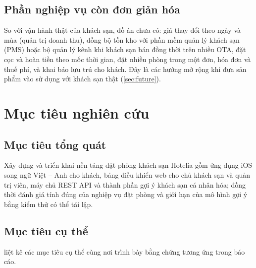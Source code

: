 \subsection{Phần nghiệp vụ còn đơn giản hóa}

So với vận hành thật của khách sạn, đồ án chưa có: giá thay đổi theo ngày và mùa (quản trị doanh thu), đồng bộ tồn kho với phần mềm quản lý khách sạn (PMS) hoặc bộ quản lý kênh khi khách sạn bán đồng thời trên nhiều OTA, đặt cọc và hoàn tiền theo mốc thời gian, đặt nhiều phòng trong một đơn, hóa đơn và thuế phí, và khai báo lưu trú cho khách. Đây là các hướng mở rộng khi đưa sản phẩm vào sử dụng với khách sạn thật (\cref{sec:future}).

\section{Mục tiêu nghiên cứu}\label{sec:objectives}

\subsection{Mục tiêu tổng quát}

Xây dựng và triển khai nền tảng đặt phòng khách sạn Hotelia gồm ứng dụng iOS song ngữ Việt -- Anh cho khách, bảng điều khiển web cho chủ khách sạn và quản trị viên, máy chủ REST API và thành phần gợi ý khách sạn cá nhân hóa; đồng thời đánh giá tính đúng của nghiệp vụ đặt phòng và giới hạn của mô hình gợi ý bằng kiểm thử có thể tái lập.

\subsection{Mục tiêu cụ thể}

 liệt kê các mục tiêu cụ thể cùng nơi trình bày bằng chứng tương ứng trong báo cáo.

